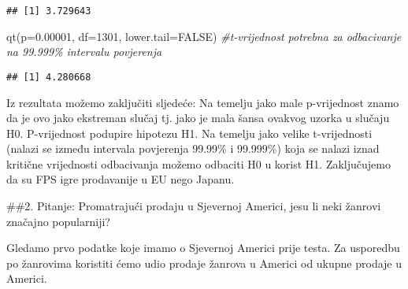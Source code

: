 \documentclass[
]{article}
\newenvironment{Shaded}{\begin{snugshade}}{\end{snugshade}}
\newcommand{\AttributeTok}[1]{\textcolor[rgb]{0.77,0.63,0.00}{#1}}
\newcommand{\CommentTok}[1]{\textcolor[rgb]{0.56,0.35,0.01}{\textit{#1}}}
\newcommand{\ConstantTok}[1]{\textcolor[rgb]{0.00,0.00,0.00}{#1}}
\newcommand{\DecValTok}[1]{\textcolor[rgb]{0.00,0.00,0.81}{#1}}
\newcommand{\FloatTok}[1]{\textcolor[rgb]{0.00,0.00,0.81}{#1}}
\newcommand{\FunctionTok}[1]{\textcolor[rgb]{0.00,0.00,0.00}{#1}}
\newcommand{\NormalTok}[1]{#1}
\newcommand{\OtherTok}[1]{\textcolor[rgb]{0.56,0.35,0.01}{#1}}
\newcommand{\SpecialCharTok}[1]{\textcolor[rgb]{0.00,0.00,0.00}{#1}}
\newcommand{\StringTok}[1]{\textcolor[rgb]{0.31,0.60,0.02}{#1}}
\begin{document}
\begin{verbatim}
## [1] 3.729643
\end{verbatim}

\begin{Shaded}
\begin{Highlighting}[]
\FunctionTok{qt}\NormalTok{(}\AttributeTok{p=}\FloatTok{0.00001}\NormalTok{, }\AttributeTok{df=}\DecValTok{1301}\NormalTok{, }\AttributeTok{lower.tail=}\ConstantTok{FALSE}\NormalTok{) }\CommentTok{\#t{-}vrijednost potrebna za odbacivanje na 99.999\% intervalu povjerenja}
\end{Highlighting}
\end{Shaded}

\begin{verbatim}
## [1] 4.280668
\end{verbatim}

Iz rezultata možemo zaključiti sljedeće: Na temelju jako male
p-vrijednost znamo da je ovo jako ekstreman slučaj tj. jako je mala
šansa ovakvog uzorka u slučaju H0. P-vrijednost podupire hipotezu H1. Na
temelju jako velike t-vrijednosti (nalazi se između intervala povjerenja
99.99\% i 99.999\%) koja se nalazi iznad kritične vrijednosti
odbacivanja možemo odbaciti H0 u korist H1. Zaključujemo da su FPS igre
prodavanije u EU nego Japanu.

\#\#2. Pitanje: Promatrajući prodaju u Sjevernoj Americi, jesu li neki
žanrovi značajno popularniji?

Gledamo prvo podatke koje imamo o Sjevernoj Americi prije testa. Za
usporedbu po žanrovima koristiti ćemo udio prodaje žanrova u Americi od
ukupne prodaje u Americi.

\begin{Shaded}
\end{Shaded}
\end{document}
